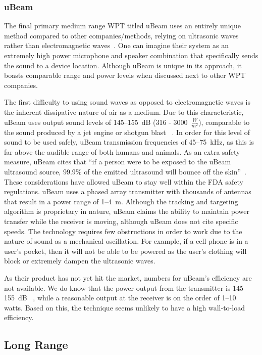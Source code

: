 \subsubsection{uBeam}
The final primary medium range WPT titled uBeam uses an entirely unique method compared to other companies/methods, relying on ultrasonic waves rather than electromagnetic waves~\cite{constine_ubeam_2015}. One can imagine their system as an extremely high power microphone and speaker combination that specifically sends the sound to a device location. Although uBeam is unique in its approach, it boasts comparable range and power levels when discussed next to other WPT companies.

The first difficulty to using sound waves as opposed  to electromagnetic waves is the inherent dissipative nature of air as a medium. Due to this characteristic, uBeam uses output sound levels of \numrange{145}{155}~dB (316 - 3000~$\frac{W}{m^2}$), comparable to the sound produced by a jet engine or shotgun blast ~\cite{galencarolaudio207}. In order for this level of sound to be used safely, uBeam transmission frequencies of \numrange{45}{75}~kHz, as this is far above the audible range of both humans and animals. As an extra safety measure, uBeam cites that ``if a person were to be exposed to the uBeam ultrasound source, 99.9\% of the emitted ultrasound will bounce off the skin''~\cite{constine_ubeam_2015}. These considerations have allowed uBeam to stay well within the FDA safety regulations.
uBeam uses a phased array transmitter with thousands of antennas that result in a power range of \numrange{1}{4}~m. Although the tracking and targeting algorithm is proprietary in nature, uBeam claims the ability to maintain power transfer while the receiver is moving, although uBeam does not cite specific speeds. The technology requires few obstructions in order to work due to the nature of sound as a mechanical oscillation. For example, if a cell phone is in a user's pocket, then it will not be able to be powered as the user's clothing will block or extremely dampen the ultrasonic waves.

As their product has not yet hit the market, numbers for uBeam's efficiency are not available. We do know that the power output from the transmitter is \numrange{145}{155}~dB ~\cite{constine_ubeam_2015}, while a reasonable output at the receiver is on the order of \numrange{1}{10}~ watts. Based on this, the technique seems unlikely to have a high wall-to-load efficiency.

\subsection{Long Range}

